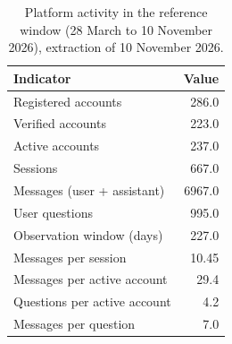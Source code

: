 \begin{table}[htbp]
\centering
\caption{Platform activity in the reference window (28 March to 10 November 2026), extraction of 10 November 2026.}
\label{tab:s5-platform-totals}
\begin{tabular}{lr}
\toprule
Indicator & Value \\
\midrule
Registered accounts & 286.0 \\
Verified accounts & 223.0 \\
Active accounts & 237.0 \\
Sessions & 667.0 \\
Messages (user + assistant) & 6967.0 \\
User questions & 995.0 \\
Observation window (days) & 227.0 \\
Messages per session & 10.45 \\
Messages per active account & 29.4 \\
Questions per active account & 4.2 \\
Messages per question & 7.0 \\
\bottomrule
\end{tabular}
\par{}
\end{table}
